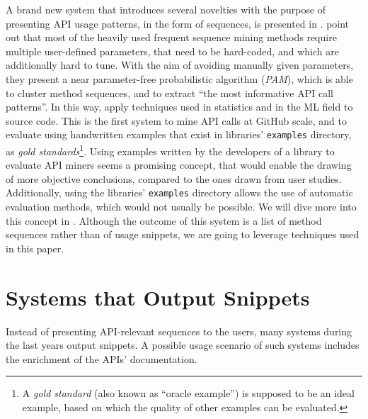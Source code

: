 A brand new system that introduces several novelties with the purpose of presenting API usage patterns, in the form of sequences, is presented in \citep{Fowkes2:2015}.  point out that most of the heavily used frequent sequence mining methods require multiple user-defined parameters, that need to be hard-coded, and which are additionally hard to tune. With the aim of avoiding manually given parameters, they present a near parameter-free probabilistic algorithm (\textit{PAM}), which is able to cluster method sequences, and to extract ``the most informative API call patterns''. In this way,  apply techniques used in statistics and in the ML field to source code. This is the first system to mine API calls at GitHub scale, and to evaluate using handwritten examples that exist in libraries' \texttt{examples} directory, as \textit{gold standards}\footnote{A \textit{gold standard} (also known as ``oracle example'') is supposed to be an ideal example, based on which the quality of other examples can be evaluated.}. Using examples written by the developers of a library to evaluate API miners seems a promising concept, that would enable the drawing of more objective conclusions, compared to the ones drawn from user studies. Additionally, using the libraries' \texttt{examples} directory allows the use of automatic evaluation methods, which would not usually be possible. We will dive more into this concept in . Although the outcome of this system is a list of method sequences rather than of usage snippets, we are going to leverage techniques used in this paper.


\section{Systems that Output Snippets}
\label{sec:snippet-systems}

Instead of presenting API-relevant sequences to the users, many systems during the last years output snippets. A possible usage scenario of such systems includes the enrichment of the APIs' documentation.

